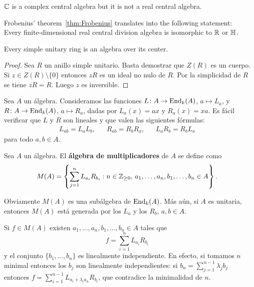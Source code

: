 \begin{example}
	$\mathbb{C}$ is a complex central algebra but it is not a real central 
	algebra. 
\end{example}

Frobenius' theorem~\ref{thm:Frobenius} translates into 
the following statement: Every finite-dimensional  
real central division algebra is isomorphic to $\mathbb{R}$ or $\mathbb{H}$. 

\begin{proposition}
	Every simple unitary ring is an algebra over its center. 
\end{proposition}

\begin{proof}
	Sea $R$ un anillo simple unitario. Basta demostrar que $Z(R)$ es un cuerpo. Si $z\in
	Z(R)\setminus\{0\}$ entonces $zR$ es un ideal no nulo de $R$. Por la 
	simplicidad de $R$ se tiene $zR=R$. Luego $z$ es inversible. 
\end{proof}

Sea $A$ un álgebra. Consideramos las funciones $L\colon A\to\operatorname{End}_k(A)$,
$a\mapsto L_a$, y $R\colon A\to\operatorname{End}_k(A)$, $a\mapsto R_a$, dadas por
$L_a(x)=ax$ y $R_a(x)=xa$. Es fácil verificar que $L$ y $R$ son lineales y que
valen las siguientes fórmulas:
\begin{align*}
	L_{ab}=L_aL_b, && R_{ab}=R_bR_a, &&	L_aR_b=R_bL_a
\end{align*}
para todo $a,b\in A$.

\begin{definition}
	Sea $A$ un álgebra. El \textbf{álgebra de multiplicadores} de $A$ se define como
	\[
		M(A)=\left\{\sum_{j=1}^n L_{a_i}R_{b_i}:n\in\mathbb{Z}_{\geq0},\,a_1,\dots,a_n,b_1,\dots,b_n\in A\right\}.
	\]
\end{definition}

Obviamente $M(A)$ es una subálgebra de $\operatorname{End}_k(A)$. Más aún, si $A$ es
unitaria, entonces $M(A)$ está generada por los $L_a$ y los $R_b$, $a,b\in A$.

\begin{remark}
	\label{rem:SkolemNoether}
	Si $f\in M(A)$ existen $a_1,\dots,a_n,b_1,\dots,b_n\in A$ tales que 
	\[
		f=\sum_{i=1}^n L_{a_i}R_{b_i}
	\]
	y el conjunto $\{b_1,\dots,b_n\}$ es linealmente independiente. En efecto,
	si tomamos $n$ minimal entonces los $b_j$ son linealmente independientes:
	si $b_n=\sum_{j=1}^{n-1}\lambda_jb_j$ entonces
	$f=\sum_{i=1}^{n-1}L_{a_i+\lambda_ia_n}R_{b_i}$, que contradice la
	minimalidad de $n$.
\end{remark}

